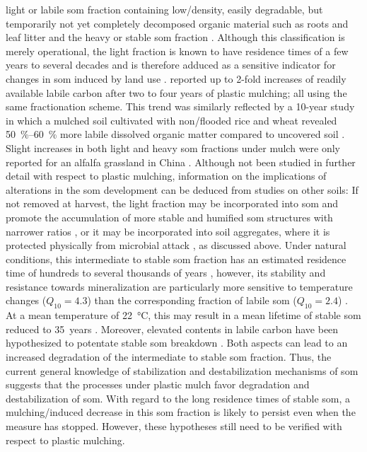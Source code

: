 light or labile \ac{som} fraction containing low\-/density, easily degradable, but temporarily not yet completely decomposed organic material such as roots and leaf litter and the heavy or stable \ac{som} fraction \citep{SollinsNet1984}. Although this classification is merely operational, the light fraction is known to have residence times of a few years to several decades \citep{vonLutzowStabilization2006} and is therefore adduced as a sensitive indicator for changes in \ac{som} induced by land use \citep{JanzenLightFraction1992}.  reported up to 2-fold increases of readily available labile carbon after two to four years of plastic mulching; all using the same fractionation scheme. This trend was similarly reflected by a \num{10}-year study in which a mulched soil cultivated with non\-/flooded rice and wheat revealed \SIrange{50}{60}{\percent} more labile dissolved organic matter compared to uncovered soil \citep{TianLabile2013}. Slight increases in both light and heavy \ac{som} fractions under mulch were only reported for an alfalfa grassland in China \citep{JiaDynamics2006}. Although not been studied in further detail with respect to plastic mulching, information on the implications of alterations in the \ac{som} development can be deduced from studies on other soils: If not removed at harvest, the light fraction may be incorporated into \ac{som} and promote the accumulation of more stable and humified \ac{som} structures \citep{ZhouRidgefurrow2012} with narrower  ratios \citep{SollinsNet1984}, or it may be incorporated into soil aggregates, where it is protected physically from microbial attack \citep{SollinsStabilization1996,vonLutzowStabilization2006}, as discussed above. Under natural conditions, this intermediate to stable \ac{som} fraction has an estimated residence time of hundreds to several thousands of years \citep{vonLutzowStabilization2006}, however, its stability and resistance towards mineralization are particularly more sensitive to temperature changes ($Q_{10} = 4.3$) than the corresponding fraction of labile \ac{som} ($Q_{10} = 2.4$) \citep{LarionovaEffect2014,vonLutzowTemperature2009}. At a mean temperature of \SI{22}{\degreeCelsius}, this may result in a mean lifetime of stable \ac{som} reduced to \num{35}~years \citep{LarionovaEffect2014}. Moreover, elevated contents in labile carbon have been hypothesized to potentate stable \ac{som} breakdown \citep{GuenetEvidence2012}. Both aspects can lead to an increased degradation of the intermediate to stable \ac{som} fraction. Thus, the current general knowledge of stabilization and destabilization mechanisms of \ac{som} suggests that the processes under plastic mulch favor degradation and destabilization of \ac{som}. With regard to the long residence times of stable \ac{som}, a mulching\-/induced decrease in this \ac{som} fraction is likely to persist even when the measure has stopped. However, these hypotheses still need to be verified with respect to plastic mulching.
